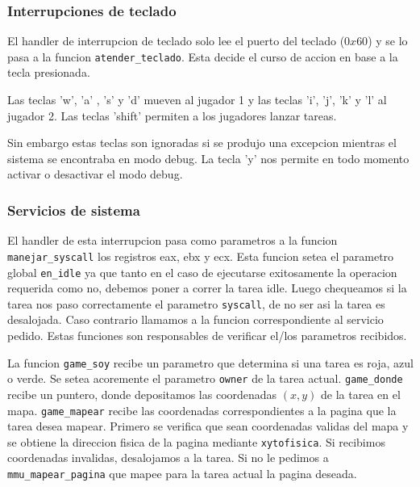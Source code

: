 \subsubsection{Interrupciones de teclado}

El handler de interrupcion de teclado solo lee el puerto del teclado ($0x60$) y se lo pasa a la funcion \verb|atender_teclado|. Esta decide el curso de accion en base a la tecla presionada. 

Las teclas 'w', 'a' , 's' y 'd' mueven al jugador 1 y las teclas 'i', 'j', 'k' y 'l' al jugador 2. Las teclas 'shift' permiten a los jugadores lanzar tareas. 

Sin embargo estas teclas son ignoradas si se produjo una excepcion mientras el sistema se encontraba en modo debug. La tecla 'y' nos permite en todo momento activar o desactivar el modo debug.


\subsubsection{Servicios de sistema}

El handler de esta interrupcion pasa como parametros a la funcion \verb|manejar_syscall| los registros eax, ebx y ecx. Esta funcion setea el parametro global \verb|en_idle| ya que tanto en el caso de ejecutarse exitosamente la operacion requerida como no, debemos poner a correr la tarea idle. Luego chequeamos si la tarea nos paso correctamente el parametro \verb|syscall|, de no ser asi la tarea es desalojada. Caso contrario llamamos a la funcion correspondiente al servicio pedido. Estas funciones son responsables de verificar el/los parametros recibidos.


La funcion \verb|game_soy| recibe un parametro que determina si una tarea es roja, azul o verde. Se setea acoremente el parametro \verb|owner| de la tarea actual.
\verb|game_donde| recibe un puntero, donde depositamos las coordenadas $(x,y)$ de la tarea en el mapa.
\verb|game_mapear| recibe las coordenadas correspondientes a la pagina que la tarea desea mapear. Primero se verifica que sean coordenadas validas del mapa y se obtiene la direccion fisica de la pagina mediante \verb|xytofisica|. Si recibimos coordenadas invalidas, desalojamos a la tarea. Si no le pedimos a \verb|mmu_mapear_pagina| que mapee para la tarea actual la pagina deseada.
